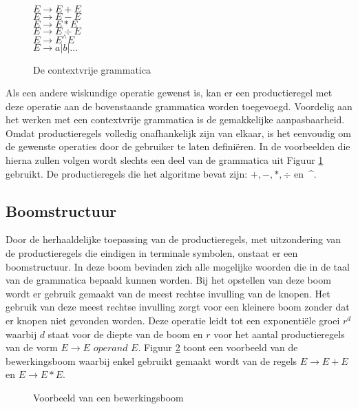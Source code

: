\documentclass[Main.tex]{subfiles}
\begin{document}
\begin{figure}[!htb]
\centering
\begin{framed}
$E \rightarrow E + E$ \\
$E \rightarrow E - E$ \\
$E \rightarrow E \ast E$ \\
$E \rightarrow E \div E$ \\
$E \rightarrow E^{\wedge}E$ \\
$E \rightarrow a | b | \dotsc$
\end{framed}
\caption{De contextvrije grammatica}
\label{fig:cfg}
\end{figure}

Als een andere wiskundige operatie gewenst is, kan er een productieregel met deze operatie aan de bovenstaande grammatica worden toegevoegd. Voordelig aan het werken met een contextvrije grammatica is de gemakkelijke aanpasbaarheid. Omdat productieregels volledig onafhankelijk zijn van elkaar, is het eenvoudig om de gewenste operaties door de gebruiker te laten defini\"eren. In de voorbeelden die hierna zullen volgen wordt slechts een deel van de grammatica uit Figuur \ref{fig:cfg} gebruikt. De productieregels die het algoritme bevat zijn: $+, -, \ast, \div$ en~\^{}.

\subsection{Boomstructuur}

Door de herhaaldelijke toepassing van de productieregels, met uitzondering van de productieregels die eindigen in terminale symbolen, onstaat er een boomstructuur. In deze boom bevinden zich alle mogelijke woorden die in de taal van de grammatica bepaald kunnen worden. Bij het opstellen van deze boom wordt er gebruik gemaakt van de meest rechtse invulling van de knopen. Het gebruik van deze meest rechtse invulling zorgt voor een kleinere boom zonder dat er knopen niet gevonden worden. Deze operatie leidt tot een exponenti\"ele groei $r^{d}$ waarbij $d$ staat voor de diepte van de boom en $r$ voor het aantal productieregels van de vorm $E \rightarrow E$  $operand$ $ E$. Figuur \ref{fig:vbBoom} toont een voorbeeld van de bewerkingsboom waarbij enkel gebruikt gemaakt wordt van de regels $E \rightarrow E+E$ en $E \rightarrow E \ast E$.

\begin{figure}[!htb]
\centering
{}
\caption{Voorbeeld van een bewerkingsboom} \label{fig:vbBoom}
\end{figure}
\end{document}
